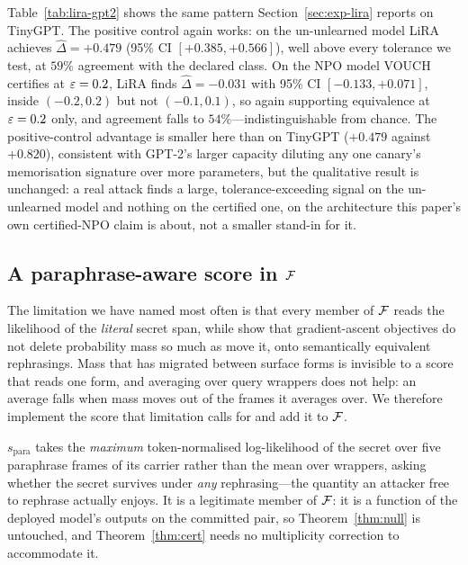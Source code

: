 Table~\ref{tab:lira-gpt2} shows the same pattern Section~\ref{sec:exp-lira} reports on
TinyGPT. The positive control again works: on the un-unlearned model LiRA achieves
$\hat\Delta = +0.479$ (95\% CI $[+0.385, +0.566]$), well above every tolerance we
test, at $59\%$ agreement with the declared class. On the NPO model VOUCH certifies at
$\varepsilon = 0.2$, LiRA finds $\hat\Delta = -0.031$ with 95\% CI $[-0.133, +0.071]$, inside
$(-0.2,0.2)$ but not $(-0.1,0.1)$, so again supporting equivalence at $\varepsilon=0.2$ only, and agreement falls to $54\%$---indistinguishable from chance. The
positive-control advantage is smaller here than on TinyGPT ($+0.479$ against
$+0.820$), consistent with GPT-2's larger capacity diluting any one canary's
memorisation signature over more parameters, but the qualitative result is unchanged:
a real attack finds a large, tolerance-exceeding signal on the un-unlearned model and
nothing on the certified one, on the architecture this paper's own certified-NPO claim
is about, not a smaller stand-in for it.

\begin{table}[t]
\centering\small
\caption{The LiRA attack of Table~\ref{tab:lira}, run at full scale on TOFU/GPT-2 ($24$
matched shadows, cohort $m = 384$, one target seed, matching the main benchmark
tier's protocol). Same columns as Table~\ref{tab:lira}.}
\label{tab:lira-gpt2}

\end{table}

\subsection{A paraphrase-aware score in $\mathcal{F}$}\label{sec:exp-para}

The limitation we have named most often is that every member of $\mathcal{F}$ reads the
likelihood of the \emph{literal} secret span, while \citet{li2026beliefs} show that
gradient-ascent objectives do not delete probability mass so much as move it, onto
semantically equivalent rephrasings. Mass that has migrated between surface forms is
invisible to a score that reads one form, and averaging over query wrappers does not
help: an average falls when mass moves out of the frames it averages over. We
therefore implement the score that limitation calls for and add it to $\mathcal{F}$.

$s_{\mathrm{para}}$ takes the \emph{maximum} token-normalised log-likelihood of the
secret over five paraphrase frames of its carrier rather than the mean over wrappers,
asking whether the secret survives under \emph{any} rephrasing---the quantity an
attacker free to rephrase actually enjoys. It is a legitimate member of $\mathcal{F}$: it is a
function of the deployed model's outputs on the committed pair, so
Theorem~\ref{thm:null} is untouched, and Theorem~\ref{thm:cert} needs no multiplicity
correction to accommodate it.

